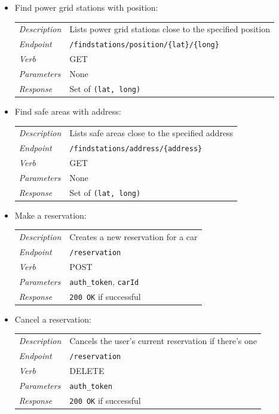 \documentclass[english]{article}
\newcommand{\code}[1]{\texttt{#1}}
\begin{document}
\begin{itemize}
	\item{Find power grid stations with position:}\\
	\begin{tabular}{ | l l }
		\textit{Description} & Lists power grid stations close to the specified position\\
		\textit{Endpoint} & \code{/findstations/position/\{lat\}/\{long\}} \\ 
		\textit{Verb} & GET \\  
		\textit{Parameters} & None \\
		\textit{Response} & Set of \code{(lat, long)}
	\end{tabular}

	\item{Find safe areas with address:}\\
	\begin{tabular}{ | l l }
		\textit{Description} & Lists safe areas close to the specified address\\
		\textit{Endpoint} & \code{/findstations/address/\{address\}} \\ 
		\textit{Verb} & GET \\  
		\textit{Parameters} & None \\
		\textit{Response} & Set of \code{(lat, long)}
	\end{tabular}
	
	\item{Make a reservation:}\\
	\begin{tabular}{ | l l }
		\textit{Description} & Creates a new reservation for a car\\
		\textit{Endpoint} & \code{/reservation} \\ 
		\textit{Verb} & POST \\  
		\textit{Parameters} & \code{auth\_token}, \code{carId} \\
		\textit{Response} & \code{200 OK} if successful
	\end{tabular}
	
	\item{Cancel a reservation:}\\
	\begin{tabular}{ | l l }
		\textit{Description} & Cancels the user's current reservation if there's one\\
		\textit{Endpoint} & \code{/reservation} \\ 
		\textit{Verb} & DELETE \\  
		\textit{Parameters} & \code{auth\_token}  \\
		\textit{Response} & \code{200 OK} if successful
	\end{tabular}
	

\end{itemize}
\end{document}
